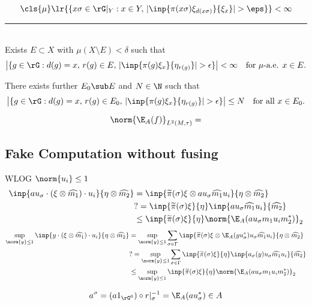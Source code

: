 \documentclass[../main.tex]{subfiles}
\begin{document}
\[
\cls{\mu}\lr{\{x\sigma \in \rG\vert_{Y} : x\in Y,\, | \inp{\pi(x \sigma) \xi_{d(x \sigma)}}{\xi_{x}}| > \eps\}} <\infty
\]


\rule{14cm}{1pt}\\

Exists $E \subset X$ with $\mu(X \setminus E) < \delta$ such that 
$$
\left|\{g \in \rG :d(g)=x,\, r(g)\in E,\, |\inp{\pi(g)\xi_x}{\eta_{r(g)}}| > \epsilon\}\right| < \infty  \quad \text{for $\mu$-a.e. $x \in E$.}
$$

There exists further $ E_{0} \sub E$ and $ N\in \N$ such that $  $
\[
\left|\{g \in \rG :d(g)=x,\, r(g)\in E_{0},\, |\inp{\pi(g)\xi_x}{\eta_{r(g)}}| > \epsilon\}\right| \leq N   \quad \text{for all $x \in E_0$.}
\]


\[
    \norm{\E_{A}(f)}_{L^{2}(M, \tau)} = 
\]


\subsection{Fake Computation without fusing}
WLOG $ \norm{u_{i}}\leq 1 $
\begin{align*}
    \inp{au_{\sigma}\cdot ( \xi \otimes \widehat{m_{1}}) \cdot u_{i}}{ \eta \otimes  \widehat{m_{2}}} &= \inp{\widetilde{\pi}(\sigma) \xi \otimes  au_{\sigma} \widehat{m_{1}} u_{i}}{ \eta \otimes \widehat{m_{2}}}\\
    &?=\inp{\widetilde{\pi}(\sigma) \xi }{\eta}\inp{au_{\sigma} \widehat{m_{1}} u_{i}}{\widehat{m_{2}}}\\
    &\leq \inp{\widetilde{\pi}(\sigma) \xi }{\eta} \norm{\E_{A}(au_{\sigma}m_{1}u_{i}m_{2}^{*})}_{2}
\end{align*}
\begin{align*}
    \sup_{\norm{y}\leq1}\inp{y\cdot ( \xi \otimes \widehat{m_{1}}) \cdot u_{i}}{ \eta \otimes  \widehat{m_{2}}} &= \sup_{\norm{y}\leq1}\sum_{\sigma\in \Gamma}\inp{\widetilde{\pi}(\sigma) \xi \otimes  \E_{A}(y u_{\sigma}^{*})u_{\sigma} \widehat{m_{1}} u_{i}}{ \eta \otimes \widehat{m_{2}}}\\
    &?=\sup_{\norm{y}\leq1}\sum_{\sigma\in \Gamma}\inp{\widetilde{\pi}(\sigma) \xi }{\eta}\inp{a_{\sigma}(y)u_{\sigma} \widehat{m_{1}} u_{i}}{\widehat{m_{2}}}\\
    &\leq\sup_{\norm{y}\leq1} \inp{\widetilde{\pi}(\sigma) \xi }{\eta} \norm{\E_{A}(au_{\sigma}m_{1}u_{i}m_{2}^{*})}_{2}
\end{align*}


\[
    a^{\sigma} = (a 1_{\rG^{0}})\circ r\vert_{\sigma}^{-1} =\E_A(au_{\sigma}^{*})\in A
\]
\end{document}
